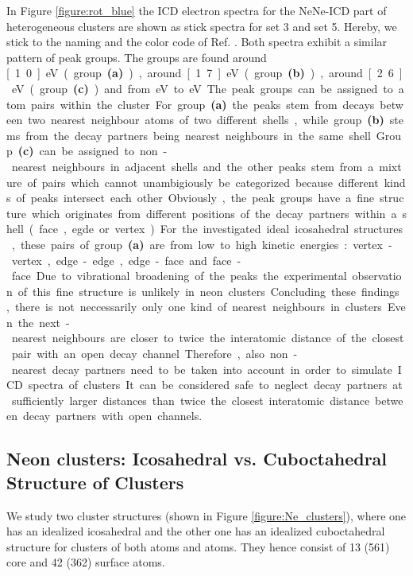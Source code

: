 In Figure \ref{figure:rot_blue} the ICD electron spectra for the NeNe-ICD
part of heterogeneous clusters are shown as stick spectra
for set 3 and set 5. Hereby, we stick to the naming and the color code of
Ref. \cite{Fasshauer14_1}. Both spectra exhibit a similar pattern of peak groups.
The groups are found around \unit[1.0]{eV} (group \textbf{(a)}),
around \unit[1.7]{eV} (group \textbf{(b)}), around \unit[2.6]{eV}
(group \textbf{(c)})
and from \unit[3]{eV} to \unit[4]{eV}.
The peak groups can be assigned to atom pairs
within the cluster. For group \textbf{(a)} the peaks stem from decays
between two nearest neighbour atoms of two different shells,
while group \textbf{(b)}
stems from the decay partners being nearest neighbours in the same shell.
Group \textbf{(c)} can be assigned to non-nearest neighbours in adjacent shells
and the other peaks stem from a mixture of pairs which cannot unambigiously
be categorized because different kinds of peaks intersect each other.

Obviously, the peak groups have a fine structure which originates from
different positions of the decay partners within a shell (face, egde or vertex).
For the investigated ideal icosahedral structures,
these pairs of group \textbf{(a)}
are from low to high kinetic energies: vertex-vertex, edge-edge, edge-face and
face-face. Due to vibrational broadening of the peaks the experimental observation
of this fine structure is unlikely in neon clusters.

Concluding these findings, there is not neccessarily only one kind of nearest
neighbours in clusters. Even the next-nearest neighbours are closer to
twice the interatomic distance of the closest pair with an open decay channel.
Therefore, also non-nearest decay partners need to be taken into account
in order to simulate ICD spectra of clusters.
It can be considered safe to neglect decay partners at sufficiently larger
distances than twice the closest interatomic distance between decay partners
with open channels.


\subsection{Neon clusters: Icosahedral vs. Cuboctahedral Structure of Clusters}
\label{sec:icofcc}
We study two cluster structures (shown in Figure \ref{figure:Ne_clusters}),
where one has an
idealized icosahedral and the other one has an idealized cuboctahedral structure
for clusters of both \unit[55]{atoms} and \unit[923]{atoms}.
They hence consist of 13 (561) core and 42 (362) surface atoms.

